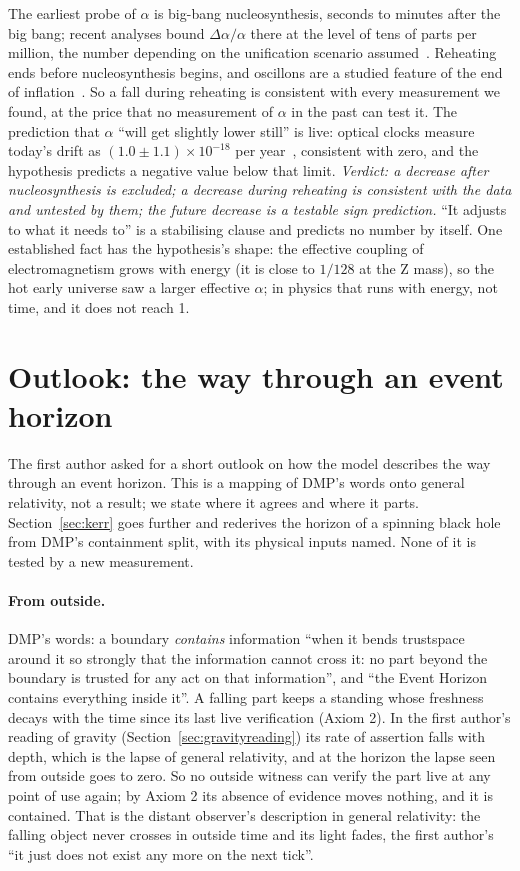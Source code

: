 \documentclass[11pt,a4paper]{article}
\theoremstyle{definition}
\theoremstyle{remark}
\begin{document}
\noindent The earliest probe of $\alpha$ is big-bang nucleosynthesis, seconds to minutes after the big bang; recent analyses bound
$\Delta\alpha/\alpha$ there at the level of tens of parts per million, the number depending on the unification scenario
assumed~\cite{bbn}. Reheating ends before nucleosynthesis begins, and oscillons are a studied feature of the end of
inflation~\cite{oscillons}. So a fall during reheating is consistent with every measurement we found, at the price that no measurement of
$\alpha$ in the past can test it. The prediction that
$\alpha$ ``will get slightly lower still'' is live: optical clocks measure today's drift as $(1.0\pm1.1)\times10^{-18}$ per
year~\cite{lange}, consistent with zero, and the hypothesis predicts a negative value below that limit. \emph{Verdict: a decrease after
nucleosynthesis is excluded; a decrease during reheating is consistent with the data and untested by them; the future decrease is a
testable sign prediction.} ``It adjusts to what it needs to'' is a stabilising clause and predicts no number by itself. One established fact has the hypothesis's shape:
the effective coupling of electromagnetism grows with energy (it is close to $1/128$ at the Z mass), so the hot early universe saw a larger
effective $\alpha$; in physics that runs with energy, not time, and it does not reach 1.

\section{Outlook: the way through an event horizon}\label{sec:horizon}

\noindent The first author asked for a short outlook on how the model describes the way through an event horizon. This is a mapping of
DMP's words onto general relativity, not a result; we state where it agrees and where it parts. Section~\ref{sec:kerr} goes further
and rederives the horizon of a spinning black hole from DMP's containment split, with its physical inputs named. None of it is tested
by a new measurement.

\paragraph{From outside.} DMP's words: a boundary \emph{contains} information ``when it bends trustspace around it so strongly that the
information cannot cross it: no part beyond the boundary is trusted for any act on that information'', and ``the Event Horizon contains
everything inside it''. A falling part keeps a standing whose freshness decays with the time since its last live verification (Axiom 2).
In the first author's reading of gravity (Section~\ref{sec:gravityreading}) its rate of assertion falls with depth, which is the lapse of
general relativity, and at the horizon the lapse seen from outside goes to zero. So no outside witness can verify the part live at any
point of use again; by Axiom 2 its absence of evidence moves nothing, and it is contained. That is the distant observer's description in
general relativity: the falling object never crosses in outside time and its light fades, the first author's ``it just does not exist
any more on the next tick''.
\end{document}
